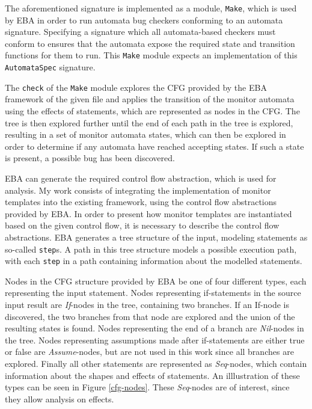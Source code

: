 \newpar The aforementioned signature is implemented as a module, \texttt{Make}, which is used by EBA in order to run automata bug checkers conforming to an automata signature. Specifying a signature which all automata-based checkers must conform to ensures that the automata expose the required state and transition functions for them to run. This \texttt{Make} module expects an implementation of this \texttt{AutomataSpec} signature. 

\newpar The \texttt{check} of the \texttt{Make} module explores the CFG provided by the EBA framework of the given file and applies the transition of the monitor automata using the effects of statements, which are represented as nodes in the CFG. The tree is then explored further until the end of each path in the tree is explored, resulting in a set of monitor automata states, which can then be explored in order to determine if any automata have reached accepting states. If such a state is present, a possible bug has been discovered. 

\newpar EBA can generate the required control flow abstraction, which is used for analysis. My work consists of integrating the implementation of monitor templates into the existing framework, using the control flow abstractions provided by EBA. In order to present how monitor templates are instantiated based on the given control flow, it is necessary to describe the control flow abstractions. EBA generates a tree structure of the input, modeling statements as so-called \texttt{step}s. A path in this tree structure models a possible execution path, with each \texttt{step} in a path containing information about the modelled statements. 

\newpar Nodes in the CFG structure provided by EBA be one of four different types, each representing the input statement. Nodes representing if-statements in the source input result are \textit{If}-nodes in the tree, containing two branches. If an If-node is discovered, the two branches from that node are explored and the union of the resulting states is found. Nodes representing the end of a branch are \textit{Nil}-nodes in the tree. Nodes representing assumptions made after if-statements are either true or false are \textit{Assume}-nodes, but are not used in this work since all branches are explored. Finally all other statements are represented as \textit{Seq}-nodes, which contain information about the shapes and effects of statements. An illlustration of these types can be seen in Figure \ref{cfg-nodes}. These \textit{Seq}-nodes are of interest, since they allow analysis on effects.  

